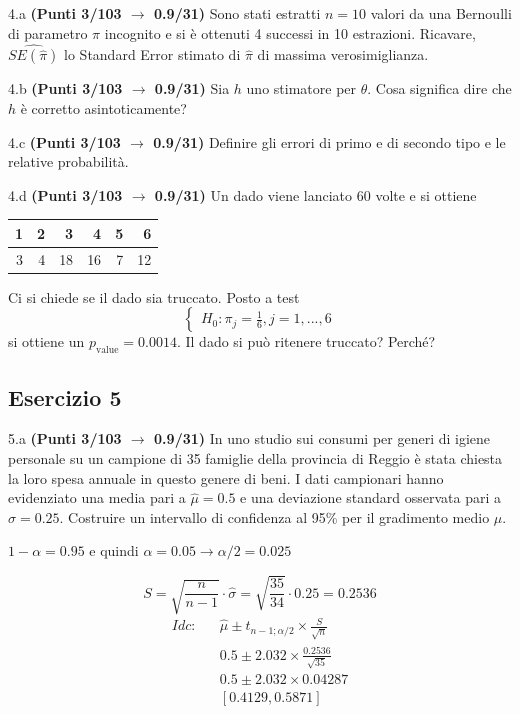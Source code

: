 \documentclass[
  11pt,
]{book}
\theoremstyle{mytheoremstyle}
\theoremstyle{mydefstyle}
\newenvironment{sol}
  {
  \begin{tcolorbox}[enhanced,breakable,arc=0.1mm,boxrule=1pt,colback=white,colframe=iblue,
  title=\bf \fontfamily{lmss}\selectfont \hspace{.5 cm} Soluzione,drop fuzzy shadow]

}{
\end{tcolorbox}
  }
\begin{document}
4.a \textbf{(Punti 3/103 \(\rightarrow\) 0.9/31)} Sono stati estratti \(n=10\) valori da una Bernoulli di parametro \(\pi\) incognito e si è ottenuti 4 successi in 10 estrazioni. Ricavare, \(\widehat{SE(\hat\pi)}\) lo Standard Error stimato di \(\hat\pi\) di massima verosimiglianza.

4.b \textbf{(Punti 3/103 \(\rightarrow\) 0.9/31)} Sia \(h\) uno stimatore per \(\theta\). Cosa significa dire che \(h\) è corretto asintoticamente?

4.c \textbf{(Punti 3/103 \(\rightarrow\) 0.9/31)} Definire gli errori di primo e di secondo tipo e le relative probabilità.

4.d \textbf{(Punti 3/103 \(\rightarrow\) 0.9/31)} Un dado viene lanciato 60 volte e si ottiene

\begin{table}[H]
\centering
\begin{tabular}{rrrrrr}
\toprule
1 & 2 & 3 & 4 & 5 & 6\\
\midrule
3 & 4 & 18 & 16 & 7 & 12\\
\bottomrule
\end{tabular}
\end{table}

Ci si chiede se il dado sia truccato. Posto a test
\[
\begin{cases}
H_0:\pi_j=\frac 16, j = 1,...,6
\end{cases}
\]
si ottiene un \(p_{\text{value}}=0.0014\). Il dado si può ritenere truccato? Perché?

\subsection{Esercizio 5}\label{esercizio-5-25}

5.a \textbf{(Punti 3/103 \(\rightarrow\) 0.9/31)} In uno studio sui consumi per generi di igiene personale su un campione di 35 famiglie della provincia di Reggio è stata chiesta la loro spesa annuale in questo genere di beni. I dati campionari hanno evidenziato una media pari a \(\hat\mu=0.5\) e una deviazione standard osservata pari a \(\hat\sigma=0.25\).
Costruire un intervallo di confidenza al 95\% per il gradimento medio \(\mu\).

\begin{sol}
\(1-\alpha =0.95\) e quindi \(\alpha=0.05\rightarrow \alpha/2=0.025\)

\[
      S  =\sqrt{\frac {n}{n-1}}\cdot\hat\sigma =
     \sqrt{\frac { 35 }{ 34 }}\cdot 0.25 = 0.2536 
\]
\begin{eqnarray*}
  Idc: & &  \hat\mu \pm  t_{n-1;\alpha/2} \times \frac{S}{\sqrt{n}} \\
     & &  0.5 \pm  2.032 \times \frac{ 0.2536 }{\sqrt{ 35 }} \\
     & &  0.5 \pm  2.032 \times  0.04287 \\
     & & [ 0.4129 ,  0.5871 ]
\end{eqnarray*}

\end{sol}
\end{document}
